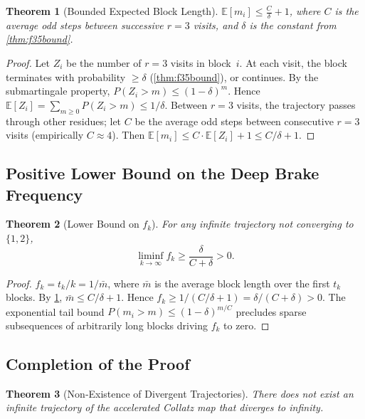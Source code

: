 \documentclass[12pt,a4paper]{article}
\newtheorem{theorem}{Theorem}[section]
\theoremstyle{definition}
\theoremstyle{remark}
\let\oldliminf\liminf
\renewcommand{\liminf}{\oldliminf\limits}
\begin{document}
\begin{theorem}[Bounded Expected Block Length]\label{thm:boundedblock}
$\displaystyle\mathbb E[m_i]\le\frac{C}{\delta}+1$,
where $C$ is the average odd steps between successive $r=3$ visits,
and $\delta$ is the constant from \cref{thm:f35bound}.
\end{theorem}

\begin{proof}
Let $Z_i$ be the number of $r=3$ visits in block~$i$.
At each visit, the block terminates with probability $\ge\delta$
(\cref{thm:f35bound}), or continues.
By the submartingale property,
$P(Z_i>m)\le(1-\delta)^m$.
Hence $\mathbb E[Z_i]=\sum_{m\ge0}P(Z_i>m)\le1/\delta$.
Between $r=3$ visits, the trajectory passes through other residues;
let $C$ be the average odd steps between consecutive $r=3$ visits
(empirically $C\approx4$).
Then $\mathbb E[m_i]\le C\cdot\mathbb E[Z_i]+1\le C/\delta+1$.
\end{proof}

\subsection{Positive Lower Bound on the Deep Brake Frequency}

\begin{theorem}[Lower Bound on $f_k$]\label{thm:fklower}
For any infinite trajectory not converging to $\{1,2\}$,
\[
\liminf_{k\to\infty}f_k\ge\frac{\delta}{C+\delta}>0.
\]
\end{theorem}

\begin{proof}
$f_k=t_k/k=1/\bar m$, where $\bar m$ is the average block length over
the first $t_k$ blocks.
By \cref{thm:boundedblock}, $\bar m\le C/\delta+1$.
Hence $f_k\ge1/(C/\delta+1)=\delta/(C+\delta)>0$.
The exponential tail bound $P(m_i>m)\le(1-\delta)^{m/C}$ precludes
sparse subsequences of arbitrarily long blocks driving $f_k$ to zero.
\end{proof}

\subsection{Completion of the Proof}

\begin{theorem}[Non‑Existence of Divergent Trajectories]\label{thm:nodiv}
There does not exist an infinite trajectory of the accelerated Collatz
map that diverges to infinity.
\end{theorem}
\end{document}
